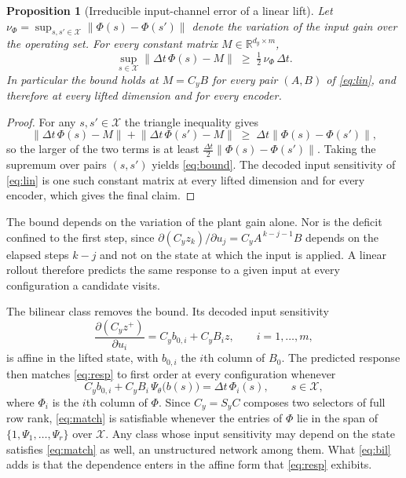 \documentclass[letterpaper,10pt,conference]{ieeeconf}
\newtheorem{proposition}{Proposition}
\begin{document}
\begin{proposition}[Irreducible input-channel error of a linear lift]
\label{prop:linear}
Let $\nu_\Phi = \sup_{s, s' \in \mathcal{X}} \| \Phi(s) - \Phi(s') \|$ denote the variation of the input gain over the operating set.
For every constant matrix $M \in \mathbb{R}^{d_y \times m}$,
\begin{equation}
\sup_{s \in \mathcal{X}} \big\| \Delta t\, \Phi(s) - M \big\|
\;\ge\; \tfrac{1}{2}\, \nu_\Phi\, \Delta t .
\label{eq:bound}
\end{equation}
In particular the bound holds at $M = C_y B$ for every pair $(A, B)$ of \eqref{eq:lin}, and therefore at every lifted dimension and for every encoder.
\end{proposition}

\begin{proof}
For any $s, s' \in \mathcal{X}$ the triangle inequality gives
\begin{equation*}
\big\| \Delta t\, \Phi(s) - M \big\| + \big\| \Delta t\, \Phi(s') - M \big\|
\;\ge\; \Delta t \big\| \Phi(s) - \Phi(s') \big\| ,
\end{equation*}
so the larger of the two terms is at least $\tfrac{\Delta t}{2}\|\Phi(s) - \Phi(s')\|$.
Taking the supremum over pairs $(s, s')$ yields \eqref{eq:bound}.
The decoded input sensitivity of \eqref{eq:lin} is one such constant matrix at every lifted dimension and for every encoder, which gives the final claim.
\end{proof}

The bound depends on the variation of the plant gain alone.
Nor is the deficit confined to the first step, since $\partial (C_y z_k)/\partial u_j = C_y A^{\,k-j-1} B$ depends on the elapsed steps $k-j$ and not on the state at which the input is applied.
A linear rollout therefore predicts the same response to a given input at every configuration a candidate visits.

The bilinear class removes the bound.
Its decoded input sensitivity
\begin{equation}
\frac{\partial (C_y z^{+})}{\partial u_i} = C_y b_{0,i} + C_y B_i z ,
\qquad i = 1, \dots, m,
\label{eq:bilsens}
\end{equation}
is affine in the lifted state, with $b_{0,i}$ the $i$th column of $B_0$.
The predicted response then matches \eqref{eq:resp} to first order at every configuration whenever
\begin{equation}
C_y b_{0,i} + C_y B_i\, \Psi_\theta\big(b(s)\big) = \Delta t\, \Phi_i(s),
\qquad s \in \mathcal{X},
\label{eq:match}
\end{equation}
where $\Phi_i$ is the $i$th column of $\Phi$.
Since $C_y = S_y C$ composes two selectors of full row rank, \eqref{eq:match} is satisfiable whenever the entries of $\Phi$ lie in the span of $\{1, \Psi_1, \dots, \Psi_r\}$ over $\mathcal{X}$.
Any class whose input sensitivity may depend on the state satisfies \eqref{eq:match} as well, an unstructured network among them.
What \eqref{eq:bil} adds is that the dependence enters in the affine form that \eqref{eq:resp} exhibits.
\end{document}
